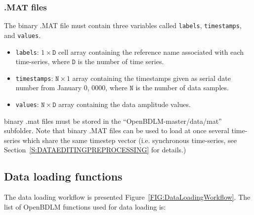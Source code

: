 \subsubsection{\MATLAB{} .MAT files}
\label{SS:MATInput}

The \MATLAB{} binary .MAT file must contain three \MATLAB{} variables called \lstinline[basicstyle = \mlttfamily \small]!labels!, \lstinline[basicstyle = \mlttfamily \small]!timestamps!, and \lstinline[basicstyle = \mlttfamily \small]!values!.
\begin{itemize}
\item \lstinline[basicstyle = \mlttfamily \small]!labels!: $1\times \mathtt{D}$ cell array containing the reference name associated with each time-series, where $\mathtt{D}$ is the number of time series.
\item \lstinline[basicstyle = \mlttfamily \small]!timestamps!: $\mathtt{N}\times 1$ array containing the timestamps given as serial date number from January 0, 0000, where $\mathtt{N}$ is the number of data samples.
\item \lstinline[basicstyle = \mlttfamily \small]!values!: $\mathtt{N}\times \mathtt{D}$ array containing the data amplitude values.
\end{itemize}
 \MATLAB{} binary .mat files must be stored in the ``OpenBDLM-master/data/mat'' subfolder.
Note that \MATLAB{} binary .MAT files can be used to load at once several time-series which share the same timestep vector (i.e. synchronous time-series, see Section~\ref{S:DATAEDITINGPREPROCESSING}  for details.)


\subsection{Data loading functions}

The data loading workflow is presented Figure~\ref{FIG:DataLoadingWorkflow}. The list of OpenBDLM functions used for data loading is:


